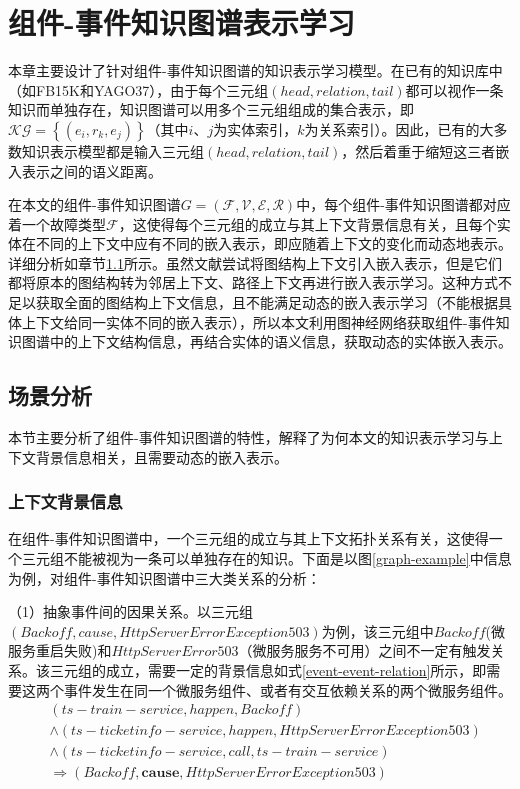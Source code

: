 \chapter{组件-事件知识图谱表示学习}\label{chapter-3}
本章主要设计了针对组件-事件知识图谱的知识表示学习模型。在已有的知识库中（如FB15K\cite{bordes2013translatingE}和YAGO37\cite{guo2018knowledge}），由于每个三元组$\left(head, relation, tail\right)$都可以视作一条知识而单独存在，知识图谱可以用多个三元组组成的集合表示，即 $\mathcal{KG}=\left\{\left(e_{i}, r_{k}, e_{j}\right)\right\}$（其中$i$、$j$为实体索引，$k$为关系索引）。因此，已有的大多数知识表示模型都是输入三元组$\left(head, relation, tail\right)$，然后着重于缩短这三者嵌入表示之间的语义距离。

在本文的组件-事件知识图谱$G=(\mathcal{F}, \mathcal{V}, \mathcal{E}, \mathcal{R})$中，每个组件-事件知识图谱都对应着一个故障类型$\mathcal{F}$，这使得每个三元组的成立与其上下文背景信息有关，且每个实体在不同的上下文中应有不同的嵌入表示，即应随着上下文的变化而动态地表示。详细分析如章节\ref{backgroud-analysis}所示。虽然文献\parencite{feng2016gake,shi2017knowledge}尝试将图结构上下文引入嵌入表示，但是它们都将原本的图结构转为邻居上下文、路径上下文再进行嵌入表示学习。这种方式不足以获取全面的图结构上下文信息，且不能满足动态的嵌入表示学习（不能根据具体上下文给同一实体不同的嵌入表示），所以本文利用图神经网络获取组件-事件知识图谱中的上下文结构信息，再结合实体的语义信息，获取动态的实体嵌入表示。
\section{场景分析}\label{backgroud-analysis}
本节主要分析了组件-事件知识图谱的特性，解释了为何本文的知识表示学习与上下文背景信息相关，且需要动态的嵌入表示。

\subsection{上下文背景信息}\label{context-analysis}
在组件-事件知识图谱中，一个三元组的成立与其上下文拓扑关系有关，这使得一个三元组不能被视为一条可以单独存在的知识。下面是以图\ref{graph-example}中信息为例，对组件-事件知识图谱中三大类关系的分析：

（1）抽象事件间的因果关系。以三元组$\left(Backoff, cause, HttpServerError Exception 503\right)$为例，该三元组中$Backoff$(微服务重启失败)和$HttpServerError 503$（微服务服务不可用）之间不一定有触发关系。该三元组的成立，需要一定的背景信息如式\ref{event-event-relation}所示，即需要这两个事件发生在同一个微服务组件、或者有交互依赖关系的两个微服务组件。
\begin{equation}
    \begin{aligned}
        &\left ( ts-train-service, happen, Backoff \right ) \\
        &\wedge \left ( ts-ticketinfo-service, happen, HttpServerError Exception 503 \right ) \\
        &\wedge \left ( ts-ticketinfo-service, call, ts-train-service \right ) \\
        &\Rightarrow \left ( Backoff, \boldsymbol{cause}, HttpServerError Exception 503 \right )
    \end{aligned}
\label{event-event-relation}
\end{equation}

